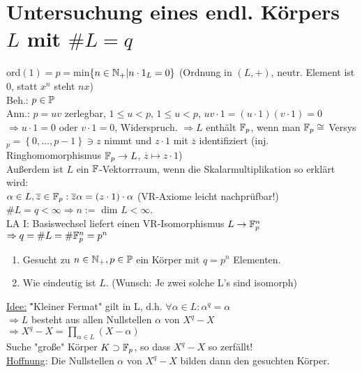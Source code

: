 \documentclass[a4paper,twoside,DIV15,BCOR12mm]{scrbook}
\begin{document}
\section{Untersuchung eines endl. Körpers $L$ mit $\#L=q$}
ord$(1)=p=$min$\left\{n \in \mathbb{N}_+ | n \cdot 1_L = 0\right\}$ (Ordnung in $(L,+)$, neutr. Element ist $0$, statt $x^n$ steht $nx$)\\
Beh.: $p \in \mathbb{P}$\\
Ann.: $p=uv$ zerlegbar, $1\leq u < p$, $1\leq u < p$, $uv \cdot 1 = (u\cdot 1)(v\cdot 1) = 0$ \\ $\Rightarrow u\cdot 1=0$ oder $v \cdot 1 = 0$, Widerspruch.
$\Rightarrow L$ enthält $\mathbb{F}_p$, wenn man $\mathbb{F}_p \cong $ Versys$_p = \left\{0,\dotsc,p-1\right\} \ni z$ nimmt und $z \cdot 1$ mit $\overline{z}$ identifiziert (inj. Ringhomomorphismus $\mathbb{F}_p \to L$, $\overline{z} \mapsto z \cdot 1$) \\
Außerdem ist $L$ ein $\mathbb{F}$-Vektorrraum, wenn die Skalarmultiplikation so erklärt wird: \\
$\alpha \in L,\overline{z} \in \mathbb{F}_p:\overline{z}\alpha = (z\cdot 1) \cdot \alpha$ (VR-Axiome leicht nachprüfbar!)\\
$\#L=q < \infty \Rightarrow n :=$ dim $L < \infty$.\\
LA I: Basiswechsel liefert einen VR-Isomorphismus $L \to \mathbb{F}_p^n$ \\
$\Rightarrow q = \#L = \#\mathbb{F}_p^n = p^n$

\begin{enumerate}
\item Gesucht zu $n \in \mathbb{N}_+,p \in \mathbb{P}$ ein Körper mit $q=p^n$ Elementen.
\item Wie eindeutig ist $L$. (Wunsch: Je zwei solche L's sind isomorph)
\end{enumerate}
\begin{tabbing}
\underline{Idee:} \= "Kleiner Fermat" gilt in L, d.h. $\forall \alpha \in L: \alpha^q = \alpha$ \\
\> $\Rightarrow L$ besteht aus allen Nullstellen $\alpha$ von $X^q-X$ \\
\> $\Rightarrow X^q-X=\prod_{\alpha \in L}(X-\alpha)$ \\
\> Suche "große" Körper $K \supset \mathbb{F}_p$, so dass $X^q-X$ so zerfällt! \\
\> \underline{Hoffnung}: Die Nullstellen $\alpha$ von $X^q-X$ bilden dann den gesuchten Körper.
\end{tabbing}
\end{document}

